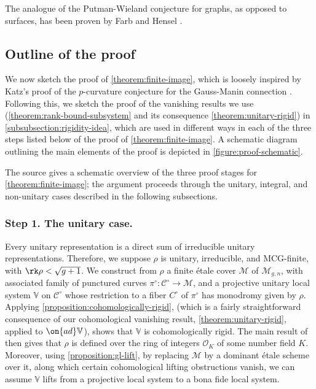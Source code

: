 The analogue of the Putman-Wieland conjecture for graphs, as opposed to surfaces, has been proven by Farb and Hensel \cite{farb2017moving}.


\subsection{Outline of the proof}\label{subsection:outline-of-proof}
We now sketch the proof of \autoref{theorem:finite-image}, which is loosely inspired by Katz's proof of the $p$-curvature conjecture for the Gauss-Manin connection \cite{katz:pcurvature-and-hodge}.
Following this, we sketch the proof of the vanishing results we use (\autoref{theorem:rank-bound-subsystem} and its consequence \autoref{theorem:unitary-rigid}) in
\autoref{subsubsection:rigidity-idea}, which are used in different ways in each of the three steps listed below of the proof of \autoref{theorem:finite-image}.
A schematic diagram outlining the main elements of the proof is depicted in
\autoref{figure:proof-schematic}.

\begin{remark}
\label{figure:proof-schematic}
The source gives a schematic overview of the three proof stages for
\autoref{theorem:finite-image}; the argument proceeds through the unitary,
integral, and non-unitary cases described in the following subsections.
\end{remark}


\subsubsection{Step 1. The unitary case.}
\label{subsubsection:step-1}
Every unitary representation is a direct sum of irreducible unitary representations.
Therefore, we suppose $\rho$ is unitary, irreducible, and MCG-finite,
with $\rk\rho<\sqrt{g+1}$. We construct from $\rho$ a finite
\'etale cover $\mathscr{M}$ of $\mathscr{M}_{g,n}$, with associated family of
punctured curves $\pi^\circ:\mathscr{C}^\circ\to \mathscr{M}$, and a projective unitary local
system $\mathbb{V}$ on $\mathscr{C}^\circ$ whose restriction to a fiber
$C^\circ$ of
$\pi^\circ$ has monodromy given by $\rho$.
Applying \autoref{proposition:cohomologically-rigid}, (which is a fairly
straightforward consequence of our cohomological vanishing result,
\autoref{theorem:unitary-rigid}, applied to $\on{ad}\mathbb{V}$),
shows that $\mathbb{V}$ is cohomologically rigid.
The main result of \cite{klevdalP:g-rigid-local-systems-are-integral} then gives that $\rho$ is defined over the ring of integers $\mathscr{O}_K$ of some number field $K$.
Moreover, using \autoref{proposition:gl-lift},
by replacing $\mathscr M$ by a dominant \'etale scheme over it, along which
certain cohomological lifting obstructions vanish, we can assume
$\mathbb V$ lifts from a projective local system to a bona fide local system.

